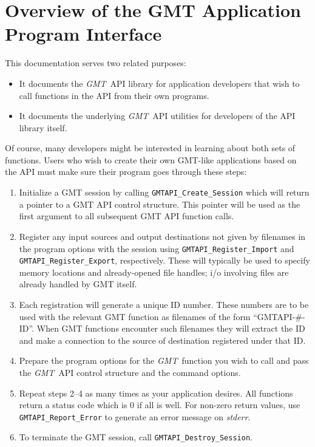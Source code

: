 \documentclass{report}
\newcommand{\GMT}{\textit{GMT}}%
\newcommand{\GMT}{\htmladdnormallink{\texttt{[image: eps/GMT\_glyph10.eps]}}{http://gmt.soest.hawaii.edu}}%
\newcommand{\GMT}{\htmladdnormallink{\textbf{GMT}}{http://gmt.soest.hawaii.edu}}%
\begin{document}
\tableofcontents 
\thispagestyle{headings}

\chapter{Overview of the GMT Application Program Interface} 
\thispagestyle{headings}

This documentation serves two related purposes:
\begin{itemize}
\item It documents the \GMT\ API library for application developers that wish
to call functions in the API from their own programs.
\item It documents the underlying \GMT\ API utilities for developers of
the API library itself.
\end{itemize}
Of course, many developers might be interested in learning about both sets of
functions.
Users who wish to create their own GMT-like applications based on the API
must make sure their program goes through these steps:

\begin{enumerate}
\item Initialize a GMT session by calling \texttt{GMTAPI\_Create\_Session} which
will return a pointer to a GMT API control structure.  This pointer will be used
as the first argument to all subsequent GMT API function calls.
\item Register any input sources and output destinations not given by filenames in
the program options with the session using
\texttt{GMTAPI\_Register\_Import} and \texttt{GMTAPI\_Register\_Export}, respectively.
These will typically be used to specify memory locations and already-opened file handles;
i/o involving files are already handled by GMT itself.
\item Each registration will generate a unique ID number.  These numbers are to be
used with the relevant GMT function as filenames of the form ``GMTAPI-\#-ID''.  When
GMT  functions encounter such filenames they will extract the ID and make a connection
to the source of destination registered under that ID.
\item Prepare the program options for the \GMT\ function you wish to call and pass
the \GMT\ API control structure and the command options.
\item Repeat steps 2--4 as many times as your application desires.  All functions
return a status code which is 0 if all is well.  For non-zero return values, use
\texttt{GMTAPI\_Report\_Error} to generate an error message on {\it stderr}.
\item To terminate the GMT session, call \texttt{GMTAPI\_Destroy\_Session}.
\end{enumerate}
\end{document}
